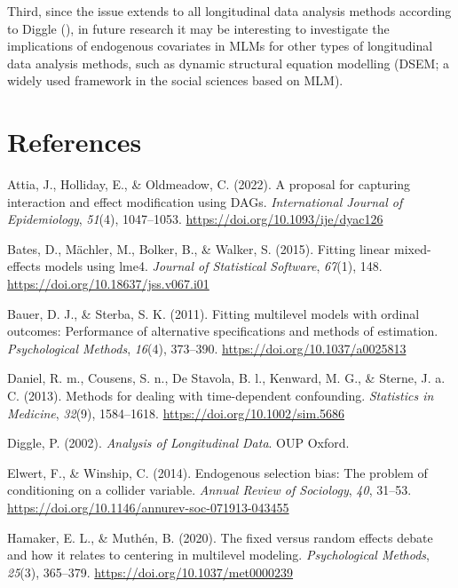 \documentclass[
  11pt,
  a4paper,
]{article}
\newlength{\cslhangindent}
\newenvironment{CSLReferences}[2] %
 {\begin{list}{}{%
  \setlength{\itemindent}{0pt}
  \setlength{\leftmargin}{0pt}
  \setlength{\parsep}{0pt}
  \ifodd #1
   \setlength{\leftmargin}{\cslhangindent}
   \setlength{\itemindent}{-1\cslhangindent}
  \fi
  \setlength{\itemsep}{#2\baselineskip}}}
 {\end{list}}
\begin{document}
Third, since the issue extends to all longitudinal data analysis methods
according to Diggle (), in future
research it may be interesting to investigate the implications of
endogenous covariates in MLMs for other types of longitudinal data
analysis methods, such as dynamic structural equation modelling (DSEM; a
widely used framework in the social sciences based on MLM).

\newpage

\section{References}\label{references}

\label{refs}
\begin{CSLReferences}{1}{0}
Attia, J., Holliday, E., \& Oldmeadow, C. (2022). A proposal for
capturing interaction and effect modification using DAGs.
\emph{International Journal of Epidemiology}, \emph{51}(4), 1047--1053.
\url{https://doi.org/10.1093/ije/dyac126}

Bates, D., Mächler, M., Bolker, B., \& Walker, S. (2015). Fitting linear
mixed-effects models using {lme4}. \emph{Journal of Statistical
Software}, \emph{67}(1), 148.
\url{https://doi.org/10.18637/jss.v067.i01}

Bauer, D. J., \& Sterba, S. K. (2011). Fitting multilevel models with
ordinal outcomes: Performance of alternative specifications and methods
of estimation. \emph{Psychological Methods}, \emph{16}(4), 373--390.
\url{https://doi.org/10.1037/a0025813}

Daniel, R. m., Cousens, S. n., De Stavola, B. l., Kenward, M. G., \&
Sterne, J. a. C. (2013). Methods for dealing with time-dependent
confounding. \emph{Statistics in Medicine}, \emph{32}(9), 1584--1618.
\url{https://doi.org/10.1002/sim.5686}

Diggle, P. (2002). \emph{Analysis of Longitudinal Data}. OUP Oxford.

Elwert, F., \& Winship, C. (2014). Endogenous selection bias: The
problem of conditioning on a collider variable. \emph{Annual Review of
Sociology}, \emph{40}, 31--53.
\url{https://doi.org/10.1146/annurev-soc-071913-043455}

Hamaker, E. L., \& Muthén, B. (2020). The fixed versus random effects
debate and how it relates to centering in multilevel modeling.
\emph{Psychological Methods}, \emph{25}(3), 365--379.
\url{https://doi.org/10.1037/met0000239}


\end{CSLReferences}
\end{document}
